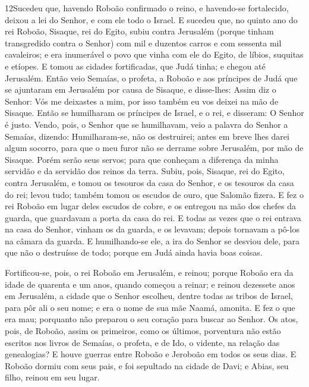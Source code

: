 \medskip

\lettrine{12} Sucedeu que, havendo Roboão confirmado o reino,
e havendo-se fortalecido, deixou a lei do Senhor, e com ele todo o
Israel. E sucedeu que, no quinto ano do rei Roboão, Sisaque, rei
do Egito, subiu contra Jerusalém (porque tinham transgredido contra
o Senhor) com mil e duzentos carros e com sessenta mil
cavaleiros; e era inumerável o povo que vinha com ele do Egito, de
líbios, suquitas e etíopes. E tomou as cidades fortificadas, que
Judá tinha; e chegou até Jerusalém. Então veio Semaías, o
profeta, a Roboão e aos príncipes de Judá que se ajuntaram em
Jerusalém por causa de Sisaque, e disse-lhes: Assim diz o Senhor:
Vós me deixastes a mim, por isso também eu vos deixei na mão de
Sisaque. Então se humilharam os príncipes de Israel, e o rei, e
disseram: O Senhor é justo. Vendo, pois, o Senhor que se
humilhavam, veio a palavra do Senhor a Semaías, dizendo:
Humilharam-se, não os destruirei; antes em breve lhes darei algum
socorro, para que o meu furor não se derrame sobre Jerusalém, por
mão de Sisaque. Porém serão seus servos; para que conheçam a
diferença da minha servidão e da servidão dos reinos da terra.
Subiu, pois, Sisaque, rei do Egito, contra Jerusalém, e tomou os
tesouros da casa do Senhor, e os tesouros da casa do rei; levou
tudo; também tomou os escudos de ouro, que Salomão fizera. E
fez o rei Roboão em lugar deles escudos de cobre, e os entregou na
mão dos chefes da guarda, que guardavam a porta da casa do rei.
E todas as vezes que o rei entrava na casa do Senhor, vinham
os da guarda, e os levavam; depois tornavam a pô-los na câmara da
guarda. E humilhando-se ele, a ira do Senhor se desviou dele,
para que não o destruísse de todo; porque em Judá ainda havia boas
coisas.

Fortificou-se, pois, o rei Roboão em Jerusalém, e reinou; porque
Roboão era da idade de quarenta e um anos, quando começou a reinar;
e reinou dezessete anos em Jerusalém, a cidade que o Senhor
escolheu, dentre todas as tribos de Israel, para pôr ali o seu nome;
e era o nome de sua mãe Naamá, amonita. E fez o que era mau;
porquanto não preparou o seu coração para buscar ao Senhor.
Os atos, pois, de Roboão, assim os primeiros, como os
últimos, porventura não estão escritos nos livros de Semaías, o
profeta, e de Ido, o vidente, na relação das genealogias? E houve
guerras entre Roboão e Jeroboão em todos os seus dias. E
Roboão dormiu com seus pais, e foi sepultado na cidade de Davi; e
Abias, seu filho, reinou em seu lugar.

\medskip

